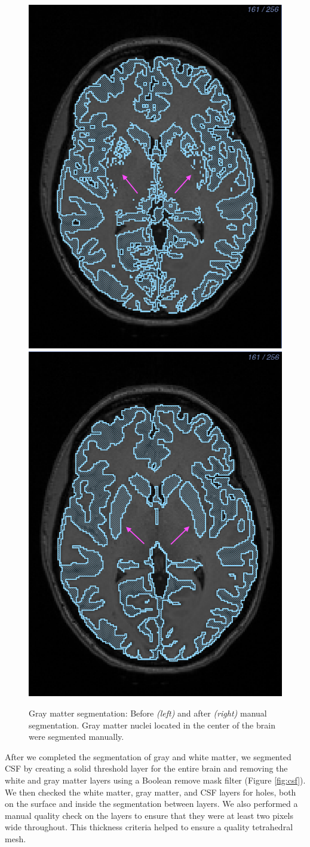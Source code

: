 \begin{figure}[H]
\begin{center}
\includegraphics[width=.49\textwidth]{Figures/greymatter_before_nuclei}
\includegraphics[width=.49\textwidth]{Figures/greymatter_added_nuclei}
\caption{Gray matter segmentation: Before \textit{(left)} and after \textit{(right)} manual segmentation. Gray matter nuclei located in the center of the brain were segmented manually.}
\label{fig:gm}
\end{center}
\end{figure}

After we completed the segmentation of gray and white matter, we segmented CSF by creating a solid threshold layer for the entire brain and removing the white and gray matter layers using a Boolean remove mask filter (Figure \ref{fig:csf}). We then checked the white matter, gray matter, and CSF layers for holes, both on the surface and inside the segmentation between layers. We also performed a manual quality check on the layers to ensure that they were at least two pixels wide throughout. This thickness criteria helped to ensure a quality tetrahedral mesh.

